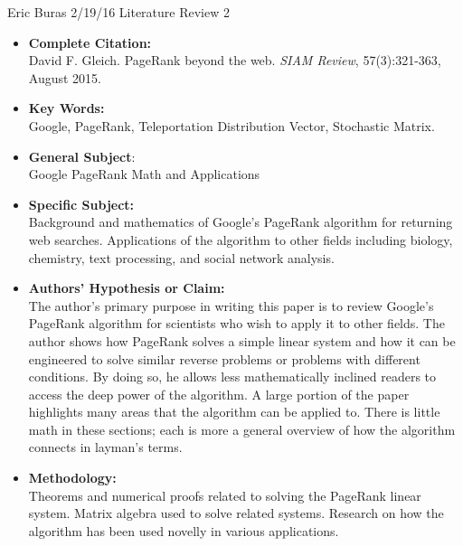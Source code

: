 \documentclass{article}
\begin{document}
Eric Buras 2/19/16 Literature Review 2
\\
\begin{itemize}
\setlength\itemsep{1em}
\item{\textbf{Complete Citation:}}
\\
David F. Gleich. PageRank beyond the web. \textit{SIAM Review}, 57(3):321-363, August 2015.

\item{\textbf{Key Words:}} 
\\
Google, PageRank, Teleportation Distribution Vector, Stochastic Matrix.

\item{\textbf{General Subject}:}
\\
Google PageRank Math and Applications

\item{\textbf{Specific Subject:}}
\\
Background and mathematics of Google's PageRank algorithm for returning web searches. Applications of the algorithm to other fields including biology, chemistry, text processing, and social network analysis.

\item{\textbf{Authors' Hypothesis or Claim:}}
\\
The author's primary purpose in writing this paper is to review Google's PageRank algorithm for scientists who wish to apply it to other fields. The author shows how PageRank solves a simple linear system and how it can be engineered to solve similar reverse problems or problems with different conditions. By doing so, he allows less mathematically inclined readers to access the deep power of the algorithm. A large portion of the paper highlights many areas that the algorithm can be applied to. There is little math in these sections; each is more a general overview of how the algorithm connects in layman's terms.

\item{\textbf{Methodology:}}
\\
Theorems and numerical proofs related to solving the PageRank linear system. Matrix algebra used to solve related systems. Research on how the algorithm has been used novelly in various applications.


\end{itemize}
\end{document}
